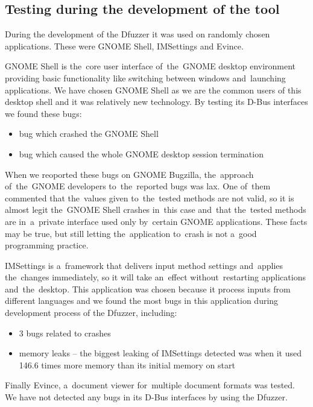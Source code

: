 \documentclass[conference]{IEEEtran}
\begin{document}
\subsection{Testing during the development of the tool}
During the development of the Dfuzzer it was used on randomly chosen applications.
These were GNOME Shell, IMSettings and Evince.

GNOME Shell is the~core user interface of~the~GNOME desktop environment
providing basic functionality like switching between windows and~launching
applications. We have chosen GNOME Shell as we are the common users of this
desktop shell and it was relatively new technology. By testing its D-Bus
interfaces we found these bugs:
\begin{itemize}
	\item bug which crashed the GNOME Shell
	\item bug which caused the whole GNOME desktop session termination
\end{itemize}
When we reoported these bugs on GNOME Bugzilla, the~approach of~the~GNOME
developers to~the~reported bugs was lax. One of~them commented that the~values
given to~the~tested methods are not valid, so it is almost legit
the~GNOME Shell crashes in~this case and~that the~tested methods are
in~a~private interface used only by~certain GNOME applications. These facts may
be true, but still letting the~application to~crash is not a~good programming
practice.

IMSettings is a~framework that delivers input method settings and~applies the~changes
immediately, so it will take an~effect without~restarting applications
and~the~desktop. This application was chosen because it process inputs
from different languages and we found the most bugs in this application during
development process of the Dfuzzer, including:
\begin{itemize}
	\item 3 bugs related to crashes
	\item memory leaks -- the biggest leaking of IMSettings detected was when it
		used 146.6 times more memory than its initial memory on start
\end{itemize}

Finally Evince, a~document viewer for~multiple document formats was tested.
We have not detected any bugs in its D-Bus interfaces by using the Dfuzzer.
\end{document}
